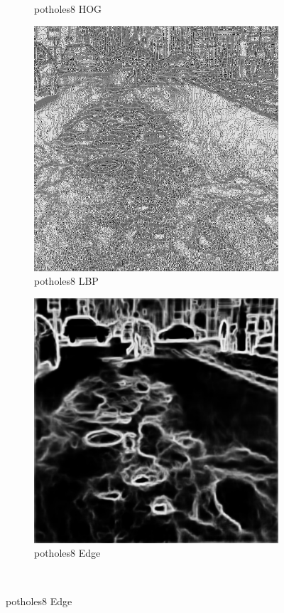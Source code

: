 \documentclass[a4paper, 10pt]{article}
\begin{document}
\begin{figure}[htbp]
\begin{subfigure}{0.24\textwidth}
			\caption*{potholes8 HOG}
			\label{fig: potholes8 HOG}
		\end{subfigure}	
		\begin{subfigure}{0.24\textwidth}
			\includegraphics[width=\linewidth]{picture/alldata_lbp/potholes8}
			\caption*{potholes8 LBP}
			\label{fig: potholes8 LBP}
		\end{subfigure}
		\begin{subfigure}{0.24\textwidth}
			\includegraphics[width=\linewidth]{picture/alldata_edge/potholes8}
			\caption*{potholes8 Edge}
			\label{fig: potholes8 Edge}
		\end{subfigure} \\
		

\end{figure}
\end{document}
